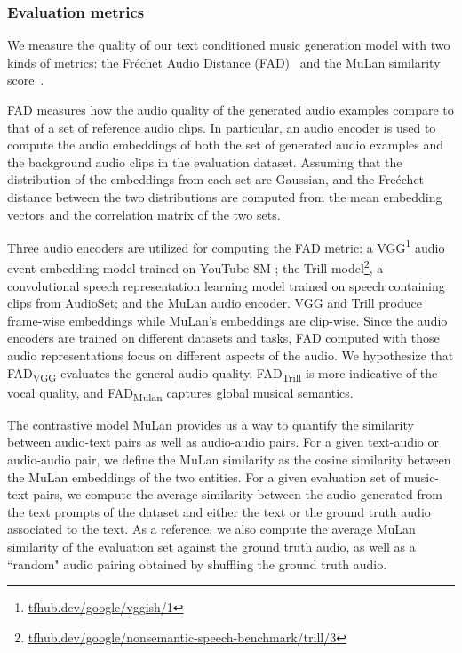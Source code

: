 \subsubsection{Evaluation metrics} 
We measure the quality of our text conditioned music generation model with two kinds of metrics: the Fr\'echet Audio Distance (FAD)~\cite{kilgour2018fr} and the MuLan similarity score~\cite{mulan2022}. 

FAD measures how the audio quality of the generated audio examples compare to that of a set of reference audio clips.
In particular, an audio encoder is used to compute the audio embeddings of both the set of generated audio examples and the background audio clips in the evaluation dataset. Assuming that the distribution of the embeddings from each set are Gaussian, and the Fre\'echet distance between the two distributions are computed from the mean embedding vectors and the correlation matrix of the two sets.

Three audio encoders are utilized for computing the FAD metric:
a VGG\footnote{\href{https://tfhub.dev/google/vggish/1}{tfhub.dev/google/vggish/1}} audio event embedding model \cite{cnn-for-audio-cls} trained on YouTube-8M \cite{yt8m-data};
the Trill \cite{trill} model\footnote{\href{https://tfhub.dev/google/nonsemantic-speech-benchmark/trill/3}{tfhub.dev/google/nonsemantic-speech-benchmark/trill/3}}, a convolutional speech representation learning model trained on speech containing clips from AudioSet; and the MuLan audio encoder. VGG and Trill produce frame-wise embeddings while MuLan's embeddings are clip-wise. Since the audio encoders are trained on different datasets and tasks, FAD computed with those audio representations focus on different aspects of the audio. We hypothesize that FAD\textsubscript{VGG} evaluates the general audio quality, FAD\textsubscript{Trill} is more indicative of the vocal quality, and FAD\textsubscript{Mulan} captures global musical semantics. 

The contrastive model MuLan provides us a way to quantify the similarity between audio-text pairs as well as audio-audio pairs. %
For a given text-audio or audio-audio pair, we define the MuLan similarity as the cosine similarity between the MuLan embeddings of the two entities. For a given evaluation set of music-text pairs, we compute the average similarity between the audio generated from the text prompts of the dataset and either the text or the ground truth audio associated to the text.
As a reference, we also compute the average MuLan similarity of the evaluation set against the ground truth audio, as well as a ``random" audio pairing obtained by shuffling the ground truth audio.

